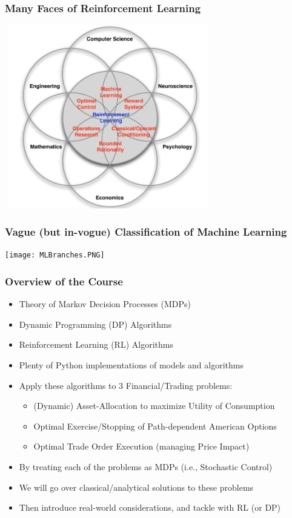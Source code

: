 \documentclass[handout]{beamer}
\begin{document}
\begin{frame}
\frametitle{Many Faces of Reinforcement Learning}
\includegraphics[width=9cm, height=8cm]{many_faces_of_RL.PNG}
\end{frame}

\begin{frame}
\frametitle{Vague (but in-vogue) Classification of Machine Learning}
\texttt{[image: MLBranches.PNG]}
\end{frame}

\begin{frame}
\frametitle{Overview of the Course}
\pause
\begin{itemize}[<+->]
\item Theory of Markov Decision Processes (MDPs)
\item Dynamic Programming (DP) Algorithms
\item Reinforcement Learning (RL) Algorithms
\item Plenty of Python implementations of models and algorithms
\item Apply these algorithms to 3 Financial/Trading problems:
\begin{itemize}
\item (Dynamic) Asset-Allocation to maximize Utility of Consumption
\item Optimal Exercise/Stopping of Path-dependent American Options
\item Optimal Trade Order Execution (managing Price Impact)
\end{itemize}
\item By treating each of the problems as MDPs (i.e., Stochastic Control)
\item We will go over classical/analytical solutions to these problems
\item Then introduce real-world considerations, and tackle with RL (or DP)
\end{itemize}
\end{frame}
\end{document}
